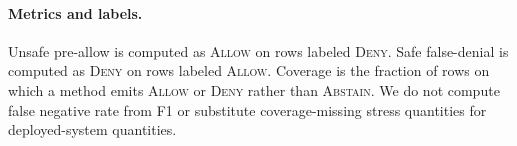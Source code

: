 \paragraph{Metrics and labels.}
Unsafe pre-allow is computed as \textsc{Allow} on rows labeled \textsc{Deny}. Safe false-denial is computed as \textsc{Deny} on rows labeled \textsc{Allow}. Coverage is the fraction of rows on which a method emits \textsc{Allow} or \textsc{Deny} rather than \textsc{Abstain}. We do not compute false negative rate from F1 or substitute coverage-missing stress quantities for deployed-system quantities.
